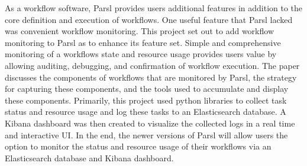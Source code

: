 As a workflow software, Parsl provides users additional features in addition to the core definition and execution of workflows.
One useful feature that Parsl lacked was convenient workflow monitoring.
This project set out to add workflow monitoring to Parsl as to enhance its feature set.
Simple and comprehensive monitoring of a workflows state and resource usage provides users value by allowing auditing, debugging, and confirmation of workflow execution.
The paper discusses the components of workflows that are monitored by Parsl, the strategy for capturing these components, and the tools used to accumulate and display these components.
Primarily, this project used python libraries to collect task status and resource usage and log these tasks to an Elasticsearch database.
A Kibana dashboard was then created to visualize the collected logs in a real time and interactive UI.
In the end, the newer versions of Parsl will allow users the option to monitor the status and resource usage of their workflows via an Elasticsearch database and Kibana dashboard.
